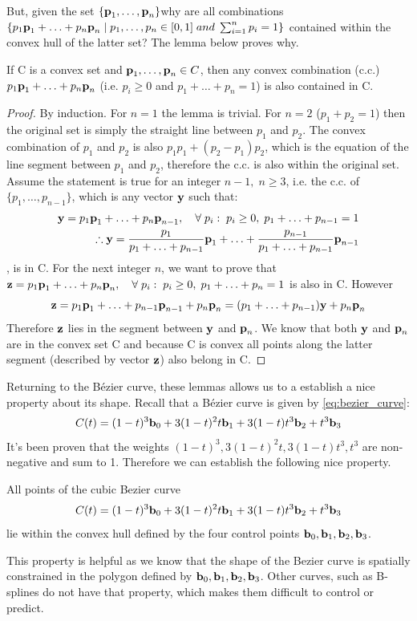 \documentclass[a4paper]{article}
\begin{document}
But, given the set $\{\textbf{p}_1,\ldots,\textbf{p}_n\}$why are all combinations $ \{p_1\textbf{p}_1 + \ldots + p_n\textbf{p}_n \; | \; p_1,\ldots,p_n\in[0,1] \; and \; \sum_{i=1}^n p_i = 1\}$ contained within the convex hull of the latter set? The lemma below proves why.
\begin{lemma}
If C is a convex set and $\textbf{p}_1,\ldots,\textbf{p}_n\in C$, then any convex combination (c.c.) $p_1\textbf{p}_1 + \ldots + p_n\textbf{p}_n$ (i.e. $p_i\geq0$ and $p_1+\ldots+p_n=1$) is also contained in C.
\end{lemma}
\begin{proof}
By induction.
For $n=1$ the lemma is trivial.
For $n=2$ ($p_1+p_2=1$) then the original set is simply the straight line between $p_1$ and $p_2$. The convex combination of $p_1$ and $p_2$ is also $p_1p_1 + (p_2-p_1)p_2$, which is the equation of the line segment between $p_1$ and $p_2$, therefore the c.c. is also within the original set.
Assume the statement is true for an integer $n-1, \; n \geq 3$, i.e. the c.c. of $\{p_1,\ldots,p_{n-1}\}$, which is any vector $\textbf{y}$ such that:
\begin{align*}
\textbf{y} = p_1\textbf{p}_1+\ldots+p_n\textbf{p}_{n-1}, \quad \forall \; p_i: \; p_i\geq 0, \; p_1+\ldots+p_{n-1}=1 \\
    \therefore \textbf{y} = \frac{p_1}{p_1+\ldots+p_{n-1}}\textbf{p}_1 + \ldots + \frac{p_{n-1}}{p_1 + \ldots + p_{n-1}}\textbf{p}_{n-1}
\end{align*}
, is in C.
For the next integer $n$, we want to prove that $\textbf{z}=p_1\textbf{p}_1+\ldots+p_n\textbf{p}_n, \quad \forall \; p_i: \; p_i\geq 0, \; p_1+\ldots+p_n=1$ is also in C. However
\[
\textbf{z} = p_1\textbf{p}_1 + \ldots + p_{n-1}\textbf{p}_{n-1} + p_n\textbf{p}_n = (p_1+\ldots+p_{n-1})\textbf{y} + p_n\textbf{p}_n
\]
Therefore $\textbf{z}$ lies in the segment between $\textbf{y}$ and $\textbf{p}_n$. We know that both $\textbf{y}$ and $\textbf{p}_n$ are in the convex set C and because C is convex all points along the latter segment (described by vector $\textbf{z}$) also belong in C. 
\end{proof}
Returning to the B\'ezier curve, these lemmas allows us to a establish a nice property about its shape. Recall that a B\'ezier curve is given by \eqref{eq:bezier_curve}:
\[
C(t) = (1-t)^3\textbf{b}_0 + 3(1-t)^2t\textbf{b}_1 + 3(1-t)t^3\textbf{b}_2 + t^3\textbf{b}_3
\]
It’s been proven that the weights $(1-t)^3,3(1-t)^2t,3(1-t)t^3,t^3$ are non-negative and sum to 1. Therefore we can establish the following nice property.
\begin{lemma}
All points of the cubic Bezier curve 
\[
C(t) = (1-t)^3\textbf{b}_0 + 3(1-t)^2t\textbf{b}_1 + 3(1-t)t^3\textbf{b}_2 + t^3\textbf{b}_3
\]
lie within the convex hull defined by the four control points $\textbf{b}_0, \textbf{b}_1, \textbf{b}_2, \textbf{b}_3$.
\end{lemma}
This property is helpful as we know that the shape of the Bezier curve is spatially constrained in the polygon defined by $\textbf{b}_0, \textbf{b}_1, \textbf{b}_2, \textbf{b}_3$. Other curves, such as B-splines do not have that property, which makes them difficult to control or predict.
\end{document}
